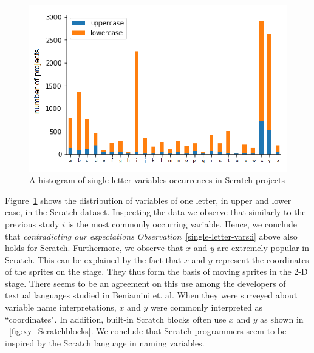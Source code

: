 \documentclass[conference]{IEEEtran}
\begin{document}
\begin{figure}[tb]
	\begin{center}
		\includegraphics[width=0.95\columnwidth]{fig/project/varname_singleletter-project}
		\caption{A histogram of single-letter variables occurrences in Scratch projects }
		\label{fig:one_letter_occurrence}
	\end{center}
\end{figure} 
Figure~\ref{fig:one_letter_occurrence} shows the distribution of variables of one letter, in upper and lower case, in the Scratch dataset. 
Inspecting the data we observe that similarly to the previous study $i$ is the most commonly occurring variable. 
Hence, we conclude that \emph{contradicting our expectations} \emph{Observation}~\ref{single-letter-vars:i} above also holds for Scratch.
Furthermore, we observe that $x$ and $y$ are extremely popular in Scratch. 
This can be explained by the fact that $x$ and $y$ represent the coordinates of the sprites on the stage. They thus form the basis of moving sprites in the 2-D stage. There seems to be an agreement on this use among the developers of textual languages studied in Beniamini et. al. When they were surveyed about variable name interpretations, $x$ and $y$ were commonly interpreted as ``coordinates". In addition, built-in Scratch blocks often use $x$ and $y$ as shown in \figurename{~\ref{fig:xy_Scratchblocks}}. 
We conclude that Scratch programmers seem to be inspired by the Scratch language in naming variables.  
\end{document}
